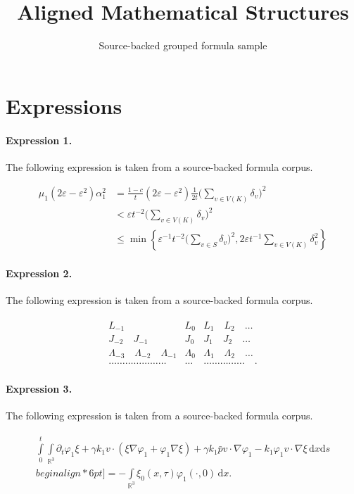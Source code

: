\documentclass[11pt]{article}
\title{Aligned Mathematical Structures}
\author{Source-backed grouped formula sample}
\date{}
\begin{document}
\maketitle
\section{Expressions}
\paragraph{Expression 1.} The following expression is taken from a source-backed formula corpus.

\begin{align*}\mu_1(2\varepsilon-\varepsilon^2)\alpha_1^2 &= \frac{1-c}{t}(2\varepsilon-\varepsilon^2)\frac{1}{2t} \bigg(\sum_{v \in V(K)} \delta_v \bigg)^2 \\&< \varepsilon t^{-2} \bigg(\sum_{v\in V(K)} \delta_v \bigg)^2 \\&\leq \min\left\{ \varepsilon^{-1} t^{-2} \bigg(\sum_{v\in S}\delta_v \bigg)^2, 2\varepsilon t^{-1}\sum_{v \in V(K)} \delta_v^2\right\} \end{align*}

\paragraph{Expression 2.} The following expression is taken from a source-backed formula corpus.

\begin{align*}\begin{array}{rcl} L_{-1}& L_{0} & L_{1}\quad L_{2} \quad \ldots \\ J_{-2}\quad J_{-1}& J_{0} & J_{1} \quad J_{2} \quad \ldots \\ \Lambda_{-3}\quad \Lambda_{-2}\quad \Lambda_{-1}& \Lambda_{0} &\Lambda_{1} \quad \Lambda_{2} \quad \ldots \\ \ldots\ldots\ldots\ldots \ldots\ldots \ldots& \ldots &\ldots \ldots \ldots \ldots \ldots \quad .\end{array}\end{align*}

\paragraph{Expression 3.} The following expression is taken from a source-backed formula corpus.

\begin{align*}\begin{array}{ll}\int\limits_0^t \int\limits_{\mathbb{R}^3}\partial_t\varphi_1\xi + \gamma k_1 v\cdot(\xi\nabla\varphi_1 +\varphi_1\nabla\xi)+\gamma k_1 \bar{p} v\cdot\nabla\varphi_1- k_1 \varphi_1 v\cdot\nabla \xi \,\mathrm{d}x\mathrm{d}s \\begin{align*}6pt]= -\int\limits_{\mathbb{R}^3}\xi_0(x,\tau) \varphi_1(\cdot,0)\,\mathrm{d}x.\end{array}\end{align*}
\end{document}
